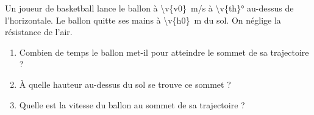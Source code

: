 Un joueur de basketball lance le ballon à \qty{\v{v0}}{m/s} à \ang{\v{th}} au-dessus de l'horizontale. Le ballon quitte ses mains à \qty{\v{h0}}{m} du sol. On néglige la résistance de l'air.

\begin{enumerate}[label=\alph*)]
    \item Combien de temps le ballon met-il pour atteindre le sommet de sa trajectoire ?
    \item À quelle hauteur au-dessus du sol se trouve ce sommet ?
    \item Quelle est la vitesse du ballon au sommet de sa trajectoire ?
\end{enumerate}

